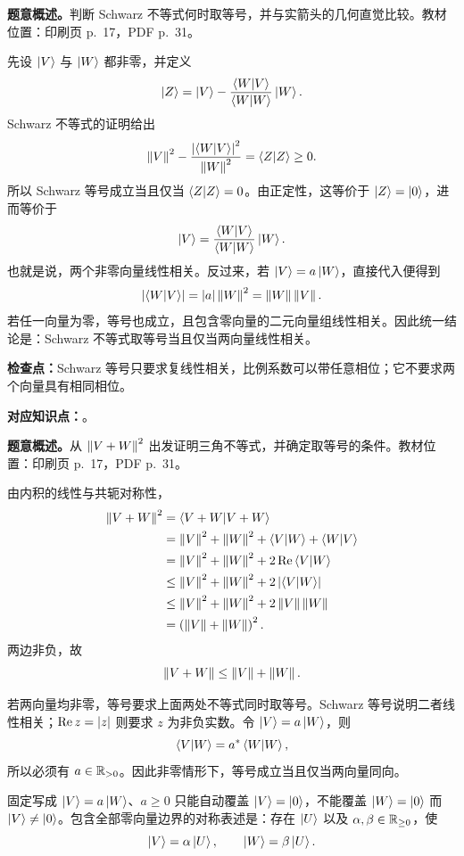 \textbf{题意概述。}判断 Schwarz 不等式何时取等号，并与实箭头的几何直觉比较。教材位置：印刷页 p.~17，PDF p.~31。

\begin{checkedsolution}
先设 $\ket{V}$ 与 $\ket{W}$ 都非零，并定义
\[
  \ket{Z}=\ket{V}
  -\frac{\braket{W}{V}}{\braket{W}{W}}\ket{W}.
\]
Schwarz 不等式的证明给出
\[
  \norm{V}^2-\frac{\abs{\braket{W}{V}}^2}{\norm{W}^2}
  =\braket{Z}{Z}\geq0.
\]
所以 Schwarz 等号成立当且仅当 $\braket{Z}{Z}=0$。由正定性，这等价于 $\ket{Z}=\ket{0}$，进而等价于
\[
  \ket{V}=\frac{\braket{W}{V}}{\braket{W}{W}}\ket{W}.
\]
也就是说，两个非零向量线性相关。反过来，若 $\ket{V}=a\ket{W}$，直接代入便得到
\[
  \abs{\braket{W}{V}}
  =\abs{a}\norm{W}^2
  =\norm{W}\norm{V}.
\]
若任一向量为零，等号也成立，且包含零向量的二元向量组线性相关。因此统一结论是：Schwarz 不等式取等号当且仅当两向量线性相关。
\end{checkedsolution}

\textbf{检查点：}Schwarz 等号只要求复线性相关，比例系数可以带任意相位；它不要求两个向量具有相同相位。


\textbf{对应知识点：}。

\textbf{题意概述。}从 $\norm{V+W}^2$ 出发证明三角不等式，并确定取等号的条件。教材位置：印刷页 p.~17，PDF p.~31。

\begin{checkedsolution}
由内积的线性与共轭对称性，
\begin{align*}
  \norm{V+W}^2
  &=\braket{V+W}{V+W}\\
  &=\norm{V}^2+\norm{W}^2
    +\braket{V}{W}+\braket{W}{V}\\
  &=\norm{V}^2+\norm{W}^2
    +2\operatorname{Re}\braket{V}{W}\\
  &\leq\norm{V}^2+\norm{W}^2
    +2\abs{\braket{V}{W}}\\
  &\leq\norm{V}^2+\norm{W}^2
    +2\norm{V}\norm{W}\\
  &=\left(\norm{V}+\norm{W}\right)^2.
\end{align*}
两边非负，故
\[
  \norm{V+W}\leq\norm{V}+\norm{W}.
\]

若两向量均非零，等号要求上面两处不等式同时取等号。Schwarz 等号说明二者线性相关；$\operatorname{Re}z=\abs{z}$ 则要求 $z$ 为非负实数。令 $\ket{V}=a\ket{W}$，则
\[
  \braket{V}{W}=a^*\braket{W}{W},
\]
所以必须有 $a\in\real_{>0}$。因此非零情形下，等号成立当且仅当两向量同向。

固定写成 $\ket{V}=a\ket{W}$、$a\geq0$ 只能自动覆盖 $\ket{V}=\ket{0}$，不能覆盖 $\ket{W}=\ket{0}$ 而 $\ket{V}\neq\ket{0}$。包含全部零向量边界的对称表述是：存在 $\ket{U}$ 以及 $\alpha,\beta\in\real_{\geq0}$，使
\[
  \ket{V}=\alpha\ket{U},
  \qquad
  \ket{W}=\beta\ket{U}.
\]
\end{checkedsolution}

